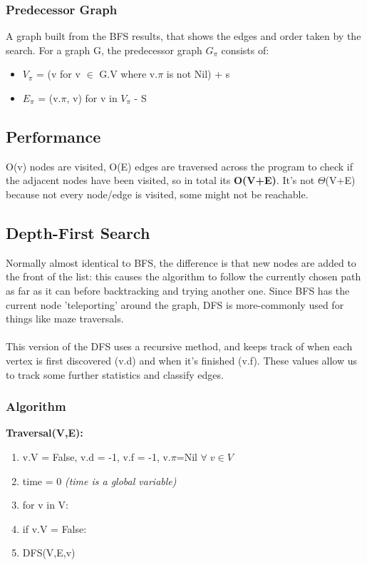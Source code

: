 \subsubsection{Predecessor Graph}
A graph built from the BFS results, that shows the edges and order taken by the search. For a graph G, the predecessor graph $G_\pi$ consists of:
\begin{itemize}
    \item $V_\pi$ = (v for v $\in$ G.V where v.$\pi$ is not Nil) + {s}
    \item $E_\pi$ = (v.$\pi$, v) for v in $V_\pi$ - {S}
\end{itemize}

\subsection{Performance}
O(v) nodes are visited, O(E) edges are traversed across the program to check if the adjacent nodes have been visited, so in total its \textbf{O(V+E)}. It's not $\Theta$(V+E) because not every node/edge is visited, some might not be reachable.

\subsection{Depth-First Search}
Normally almost identical to BFS, the difference is that new nodes are added to the front of the list: this causes the algorithm to follow the currently chosen path as far as it can before backtracking and trying another one. Since BFS has the current node 'teleporting' around the graph, DFS is more-commonly used for things like maze traversals.\\ \\
This version of the DFS uses a recursive method, and keeps track of when each vertex is first discovered (v.d) and when it's finished (v.f). These values allow us to track some further statistics and classify edges.

\subsubsection{Algorithm}

\textbf{Traversal(V,E):}
\begin{enumerate}
    \item v.V = False, v.d = -1, v.f = -1, v.$\pi$=Nil $\forall \; v\in V$
    \item time = 0 \emph{(time is a global variable)}
    \item for v in V:
    \item [] \quad if v.V = False:
    \item [] \quad \quad DFS(V,E,v)
\end{enumerate}

